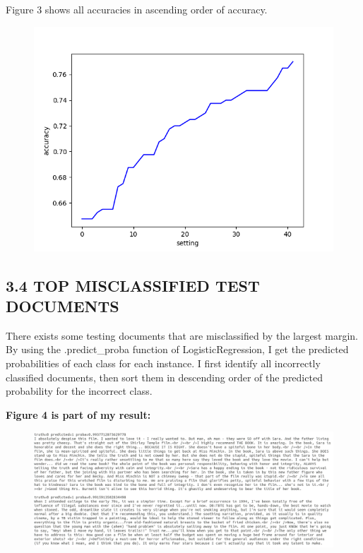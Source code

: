 \documentclass[11pt]{article}
\begin{document}
Figure 3 shows all accuracies in ascending order of accuracy.
\begin{figure}[h!]
  \centering
    \includegraphics[width=\linewidth]{3.png}
    \caption{}
\end{figure}

\subsection*{3.4 TOP MISCLASSIFIED TEST DOCUMENTS}
\hspace{1.5em}There exists some testing documents that are misclassified by the
largest margin. By using the .predict\_proba function of LogisticRegression, I get the predicted probabilities of each class for each instance. I first identify all incorrectly classified documents, then sort them in descending order of the predicted probability for the incorrect class.

\textbf{Figure 4 is part of my result:}
\begin{figure}[h!]
  \centering
    \includegraphics[width=\linewidth]{4.png}
    \caption{}
\end{figure}
\end{document}
